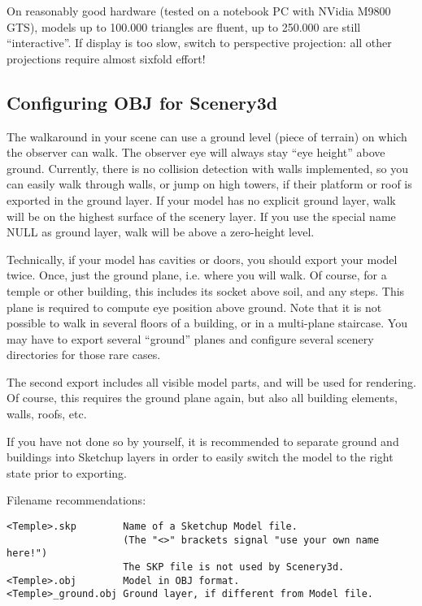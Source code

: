\documentclass[a4paper]{article}
\begin{document}
On reasonably good hardware (tested on a notebook PC with NVidia M9800
GTS), models up to 100.000 triangles are fluent, up to 250.000 are
still ``interactive''.  If display is too slow, switch to perspective
projection: all other projections require almost sixfold effort! 


\subsection{Configuring OBJ for Scenery3d}
\label{sec:Configuring}

The walkaround in your scene can use a ground level (piece of terrain)
on which the observer can walk. The observer eye will always stay ``eye
height'' above ground. Currently, there is no collision detection with
walls implemented, so you can easily walk through walls, or jump on
high towers, if their platform or roof is exported in the ground
layer. If your model has no explicit ground layer, walk will be on the
highest surface of the scenery layer.  If you use the special name
NULL as ground layer, walk will be above a zero-height level.

Technically, if your model has cavities or doors, you should export
your model twice. Once, just the ground plane, i.e. where you will
walk. Of course, for a temple or other building, this includes its
socket above soil, and any steps.  This plane is required to compute
eye position above ground. Note that it is not possible to walk in
several floors of a building, or in a multi-plane staircase. You may
have to export several ``ground'' planes and configure several scenery
directories for those rare cases.

The second export includes all visible model parts, and will be used for
rendering. Of course, this requires the ground plane again, but also
all building elements, walls, roofs, etc. 

If you have not done so by yourself, it is recommended to separate
ground and buildings into Sketchup layers in order to easily switch
the model to the right state prior to exporting.

Filename recommendations: 
\begin{verbatim}
<Temple>.skp        Name of a Sketchup Model file. 
                    (The "<>" brackets signal "use your own name here!")
                    The SKP file is not used by Scenery3d.
<Temple>.obj        Model in OBJ format. 
<Temple>_ground.obj Ground layer, if different from Model file. 
\end{verbatim}
\end{document}
